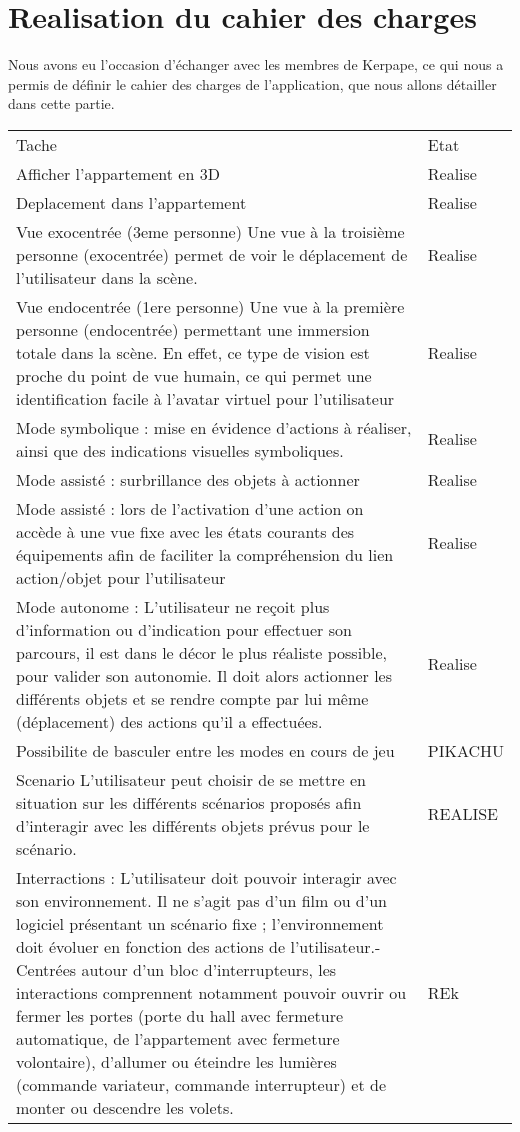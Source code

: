 \section{Realisation du cahier des charges}
Nous avons eu l'occasion d'échanger avec les membres de Kerpape, ce qui nous a permis de définir le cahier des charges de l'application, que nous allons détailler dans cette partie.
\begin{tabular}{ll}
	Tache & Etat \\
	Afficher l'appartement en 3D & Realise \\
	Deplacement dans l'appartement & Realise \\
	Vue exocentrée (3eme personne)  Une vue à la troisième personne (exocentrée) permet de voir le déplacement de l'utilisateur dans la scène. & Realise \\
	Vue endocentrée (1ere personne) Une vue à la première personne (endocentrée) permettant une immersion totale dans la scène. En effet, ce type de vision est proche du point de vue humain, ce qui permet une identification facile à l'avatar virtuel pour l'utilisateur & Realise \\
	Mode symbolique : mise en évidence d'actions à réaliser, ainsi que des indications visuelles symboliques. & Realise \\
	Mode assisté : surbrillance des objets à actionner & Realise \\
	Mode assisté : lors de l'activation d'une action on accède à une vue fixe avec les états courants des équipements afin de faciliter la compréhension du lien action/objet pour l'utilisateur & Realise \\
	Mode autonome : L'utilisateur ne reçoit plus d'information ou d'indication pour effectuer son parcours, il est dans le décor le plus réaliste possible, pour valider son autonomie. Il doit alors actionner les différents objets et se rendre compte par lui même (déplacement) des actions qu'il a effectuées.  & Realise \\
	Possibilite de basculer entre les modes en cours de jeu & PIKACHU \\
	Scenario L'utilisateur peut choisir de se mettre en situation sur les différents scénarios proposés afin d'interagir avec les différents objets prévus pour le scénario. & REALISE \\
	Interractions : L'utilisateur doit pouvoir interagir avec son environnement. Il ne s'agit pas d'un film ou d'un logiciel présentant un scénario fixe ; l'environnement doit évoluer en fonction des actions de l'utilisateur.-  Centrées autour d'un bloc d'interrupteurs, les interactions comprennent notamment pouvoir ouvrir ou fermer les portes (porte du hall avec fermeture automatique, de l'appartement avec fermeture volontaire), d'allumer ou éteindre les lumières (commande variateur, commande interrupteur) et de monter ou descendre les volets. & REk \\

\end{tabular}
